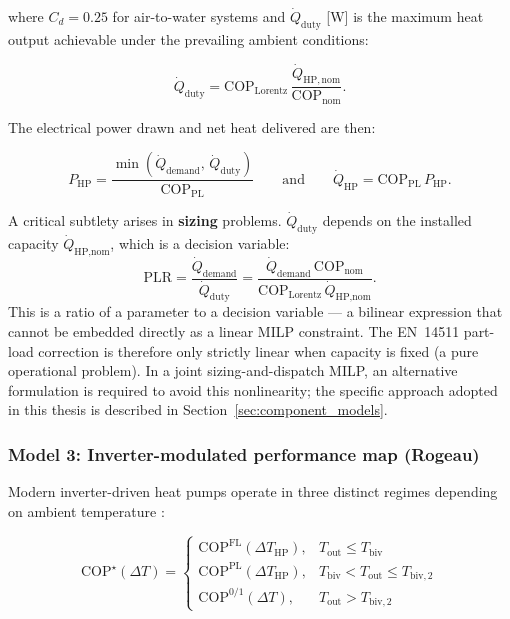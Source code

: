 \documentclass[11pt,a4paper]{report}
\begin{document}
where $C_d = 0.25$ for air-to-water systems \cite{Grassi2018HP} and $\dot{Q}_{\mathrm{duty}}$ [W] is the maximum heat output achievable under the prevailing ambient conditions:

\begin{equation}
\label{eq:duty}
\dot{Q}_{\mathrm{duty}} = \mathrm{COP}_{\mathrm{Lorentz}}\,\frac{\dot{Q}_{\mathrm{HP,nom}}}{\mathrm{COP}_{\mathrm{nom}}}.
\end{equation}

The electrical power drawn and net heat delivered are then:

\begin{equation}
\label{eq:duty_final}
P_{\mathrm{HP}} = \frac{\min(\dot{Q}_{\mathrm{demand}},\,\dot{Q}_{\mathrm{duty}})}{\mathrm{COP}_{\mathrm{PL}}}
\qquad\text{and}\qquad
\dot{Q}_{\mathrm{HP}} = \mathrm{COP}_{\mathrm{PL}}\,P_{\mathrm{HP}}.
\end{equation}

A critical subtlety arises in \textbf{sizing} problems.
$\dot{Q}_\text{duty}$ depends on the installed capacity $\dot{Q}_\text{HP,nom}$, which is a decision variable:
\begin{equation}
    \mathrm{PLR} = \frac{\dot{Q}_\text{demand}}{\dot{Q}_\text{duty}} = \frac{\dot{Q}_\text{demand}\,\mathrm{COP}_\text{nom}}{\mathrm{COP}_\text{Lorentz}\,\dot{Q}_\text{HP,nom}}.
\end{equation}
This is a ratio of a parameter to a decision variable --- a bilinear expression that cannot be embedded directly as a linear MILP constraint.
The EN~14511 part-load correction is therefore only strictly linear when capacity is fixed (a pure operational problem).
In a joint sizing-and-dispatch MILP, an alternative formulation is required to avoid this nonlinearity; the specific approach adopted in this thesis is described in Section~\ref{sec:component_models}.

\subsubsection{Model 3: Inverter-modulated performance map (Rogeau)}

Modern inverter-driven heat pumps operate in three distinct regimes depending on ambient temperature \cite{Rogeau2024HPPL}:

\begin{equation}
\label{eq:cop_star_delta_t_new}
\mathrm{COP}^{\star}(\Delta T) =
\begin{cases}
\mathrm{COP}^{\mathrm{FL}}(\Delta T_{\mathrm{HP}}), & T_{\mathrm{out}} \le T_{\mathrm{biv}} \\
\mathrm{COP}^{\mathrm{PL}}(\Delta T_{\mathrm{HP}}), & T_{\mathrm{biv}} < T_{\mathrm{out}} \le T_{\mathrm{biv},2} \\
\mathrm{COP}^{0/1}(\Delta T), & T_{\mathrm{out}} > T_{\mathrm{biv},2}
\end{cases}
\end{equation}
\end{document}
